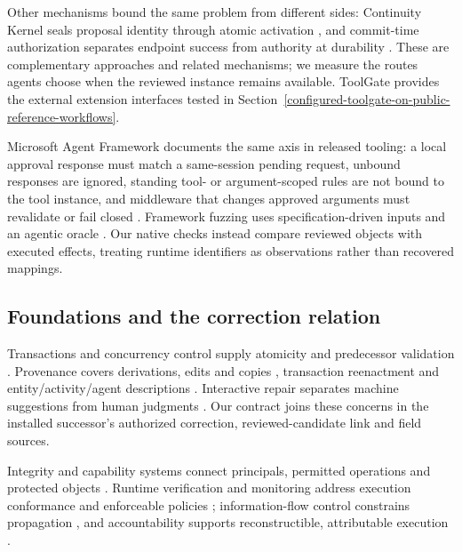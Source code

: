 \documentclass[pdflatex,sn-basic]{sn-jnl}
\begin{document}
Other mechanisms bound the same problem from different sides: Continuity Kernel seals proposal identity through atomic activation \citep{continuity-kernel}, and commit-time authorization separates endpoint success from authority at durability \citep{commit-time-auth}. These are complementary approaches and related mechanisms; we measure the routes agents choose when the reviewed instance remains available. ToolGate provides the external extension interfaces tested in Section~\ref{configured-toolgate-on-public-reference-workflows}.

Microsoft Agent Framework documents the same axis in released tooling: a local approval response must match a same-session pending request, unbound responses are ignored, standing tool- or argument-scoped rules are not bound to the tool instance, and middleware that changes approved arguments must revalidate or fail closed \citep{msaf-tool-approval}. Framework fuzzing uses specification-driven inputs and an agentic oracle \citep{logicunter}. Our native checks instead compare reviewed objects with executed effects, treating runtime identifiers as observations rather than recovered mappings.

\subsection{Foundations and the correction relation}\label{foundations-and-the-correction-relation}

Transactions and concurrency control supply atomicity and predecessor validation \citep{gray-transaction,kung-occ}. Provenance covers derivations, edits and copies \citep{buneman-provenance,cheney-provenance,buneman-curated}, transaction reenactment \citep{arab-reenactment} and entity/activity/agent descriptions \citep{prov-dm}. Interactive repair separates machine suggestions from human judgments \citep{yakout-guided-repair,falcon-cleaning}. Our contract joins these concerns in the installed successor's authorized correction, reviewed-candidate link and field sources.

Integrity and capability systems connect principals, permitted operations and protected objects \citep{clark-wilson,hardy-confused-deputy,miller-robust-composition}. Runtime verification and monitoring address execution conformance and enforceable policies \citep{runtime-verification,policy-enforcement}; information-flow control constrains propagation \citep{ifc}, and accountability supports reconstructible, attributable execution \citep{accountability}.
\end{document}
